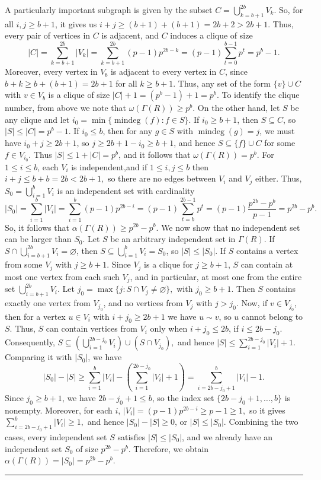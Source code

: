 \documentclass[12pt,twoside]{article}
\renewenvironment{proof}{{\noindent\bfseries Proof.}}{\qed}
\def\qed{\nolinebreak\hfill\rule{.2cm}{.2cm}\par\addvspace{.5cm}}
\begin{document}
\begin{proof}
		A particularly important subgraph is given by the subset $C = \bigcup_{k=b+1}^{2b} V_k.$ 
		So, for all $i,j\ge b+1$, it gives us $ i+j \ge (b+1)+(b+1) = 2b+2 > 2b+1.$ Thus, every pair of vertices in $C$ is adjacent, and  $C$ induces a clique of size
		\[
		|C|
		= \sum_{k=b+1}^{2b} |V_k|
		= \sum_{k=b+1}^{2b} (p-1)p^{ 2b-k}
		= (p-1)\sum_{t=0}^{b-1} p^t
		= p^{ b} - 1.
		\]
		Moreover, every vertex in $V_b$ is adjacent to every vertex in $C$, since $b + k \ge b+(b+1)=2b+1 $ for all $k\ge b+1.$	Thus, any set of the form $\{v\}\cup C$ with $v\in V_b$ is a clique of size $	|C|+1 = (p^b - 1)+1 = p^b.$ To identify the clique number, from above we note that  $\omega( \varGamma(R))\ge p^b$.	On the other hand, let $S$ be any clique and let $i_0=\min\{\operatorname{mindeg}(f): f\in S\}$.	If $i_0\ge b+1$, then $S\subseteq C$, so $|S|\le |C|=p^b-1$.
		If $i_0\le b$, then for any $g\in S$ with $\operatorname{mindeg}(g)=j$, we must have
		$i_0+j\ge 2b+1$, so $j\ge 2b+1-i_0\ge b+1$, and hence $S\subseteq \{f\}\cup C$ for some
		$f\in V_{i_0}$. Thus $|S|\le 1+|C|=p^b$, and it follows that $\omega( \varGamma(R))=p^b$.
		For $1\le i\le b$, each $V_i$ is independent,and if $1\le i,j\le b$ then $i+j \le b+b = 2b < 2b+1,$
		so there are no edges between $V_i$ and $V_j$ either. Thus, $S_0= \bigcup_{i=1}^b V_i$ is an independent set with cardinality 
		\[
		|S_0|
		= \sum_{i=1}^b |V_i|
		= \sum_{i=1}^b (p-1)p^{2b-i}
		= (p-1)\sum_{t=b}^{2b-1} p^t
		= (p-1)\frac{p^{2b}-p^b}{p-1}
		= p^{2b} - p^b.
		\]
		So, it follows that	$\alpha( \varGamma(R))\ge p^{2b} - p^b.$  We now show that no independent set can be larger than $S_0$. Let $S$ be an arbitrary independent set in $ \varGamma(R)$. If $S \cap \bigcup_{i=b+1}^{2b} V_i = \varnothing$, then $S \subseteq \bigcup_{i=1}^b V_i = S_0$, so $|S| \le |S_0|$. If $S$ contains a vertex from some $V_j$ with $j\ge b+1$.	Since $V_j$ is a clique for $j\ge b+1$, $S$ can contain at most one vertex from each such $V_j$,	and in particular, at most one from the entire set $\bigcup_{i=b+1}^{2b}V_i$. Let $	j_0 = \max\{j : S\cap V_j \neq \varnothing\},  $ with $ j_0\ge b+1.$ Then $S$ contains exactly one vertex from $V_{j_0}$, and no vertices from $V_j$ with $j>j_0$. Now, if $v\in V_{j_0}$, then for a vertex $u\in V_i$ with $i+j_0\ge 2b+1$ we have $u\sim v$,	so $u$ cannot belong to $S$. Thus, $S$ can contain vertices from $V_i$ only when $i + j_0 \le 2b  $, if $ i \le 2b - j_0.$	Consequently, $
		S \subseteq \left(\bigcup_{i=1}^{2b-j_0} V_i\right) \cup (S\cap V_{j_0}),$ 
		and hence	$|S| \le \sum_{i=1}^{2b-j_0} |V_i| + 1.$ 
		Comparing it with $|S_0|$, we have
		\[
		|S_0| - |S|\ge\sum_{i=1}^b |V_i| - \left(\sum_{i=1}^{2b-j_0} |V_i| + 1\right)
		=
		\sum_{i=2b-j_0+1}^{b} |V_i| - 1.
		\]
		Since $j_0\ge b+1$, we have $2b-j_0+1 \le b$, so the index set
		$\{2b-j_0+1,\dots,b\}$ is nonempty. Moreover, for each $i$, $|V_i| = (p-1)p^{2b-i} \ge p-1 \ge 1,$ so it gives $\sum_{i=2b-j_0+1}^{b} |V_i| \ge 1,$	and hence $|S_0|-|S|\ge 0$, or $|S|\le |S_0|$. Combining the two cases, every independent set $S$ satisfies $|S|\le |S_0|$, and we already	have an independent set $S_0$ of size $p^{2b}-p^b$. Therefore, we obtain $\alpha( \varGamma(R)) = |S_0| = p^{2b} - p^b.$
		

\end{proof}
\end{document}
